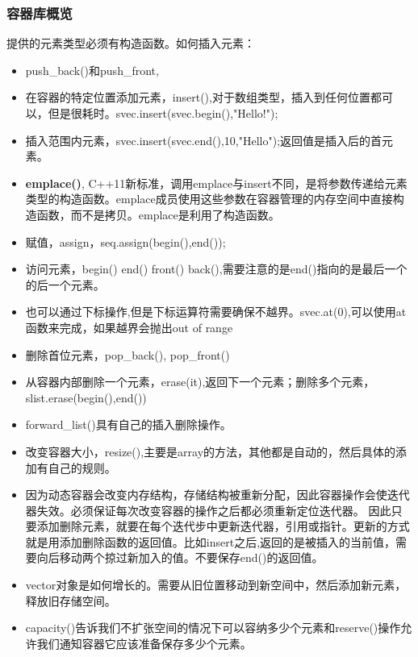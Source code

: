 \subsubsection{容器库概览}
提供的元素类型必须有构造函数。如何插入元素：
\begin{itemize}
	\item push\_back()和push\_front,
	\item 在容器的特定位置添加元素，insert(),对于数组类型，插入到任何位置都可以，但是很耗时。svec.insert(svec.begin(),"Hello!");
	\item 插入范围内元素，svec.insert(svec.end(),10,"Hello");返回值是插入后的首元素。
	\item \textbf{emplace()}, C++11新标准，调用emplace与insert不同，是将参数传递给元素类型的构造函数。emplace成员使用这些参数在容器管理的内存空间中直接构造函数，而不是拷贝。emplace是利用了构造函数。
	\item 赋值，assign，seq.assign(begin(),end());
	\item 访问元素，begin() end() front() back(),需要注意的是end()指向的是最后一个的后一个元素。
	\item 也可以通过下标操作,但是下标运算符需要确保不越界。svec.at(0),可以使用at函数来完成，如果越界会抛出out of range
	\item 删除首位元素，pop\_back(), pop\_front() 
	\item 从容器内部删除一个元素，erase(it),返回下一个元素；删除多个元素，slist.erase(begin(),end())
	\item forward\_list()具有自己的插入删除操作。	
	\item 改变容器大小，resize(),主要是array的方法，其他都是自动的，然后具体的添加有自己的规则。
	\item 因为动态容器会改变内存结构，存储结构被重新分配，因此容器操作会使迭代器失效。必须保证每次改变容器的操作之后都必须重新定位迭代器。
	因此只要添加删除元素，就要在每个迭代步中更新迭代器，引用或指针。更新的方式就是用添加删除函数的返回值。比如insert之后,返回的是被插入的当前值，需要向后移动两个掠过新加入的值。不要保存end()的返回值。
	\item vector对象是如何增长的。需要从旧位置移动到新空间中，然后添加新元素，释放旧存储空间。
	\item capacity()告诉我们不扩张空间的情况下可以容纳多少个元素和reserve()操作允许我们通知容器它应该准备保存多少个元素。
\end{itemize}

